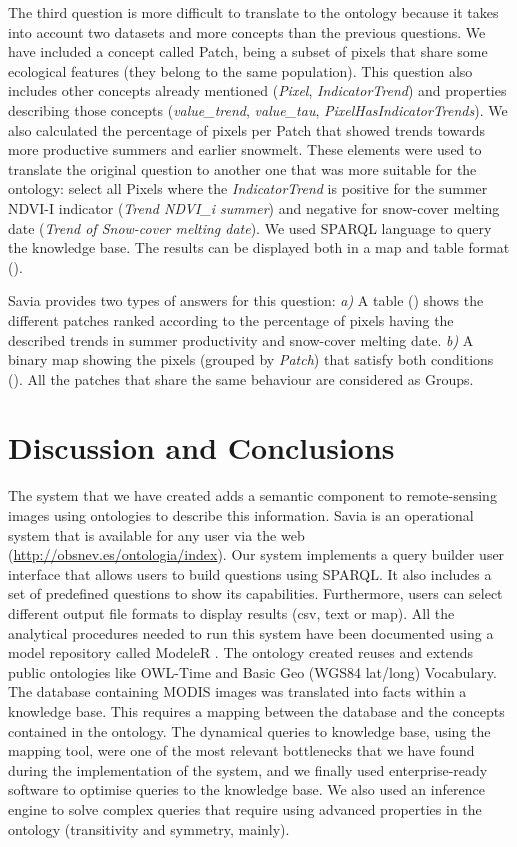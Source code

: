 The third question is more difficult to translate to the ontology because it takes into account two datasets and more concepts than the previous questions. We have included a concept called Patch, being a subset of pixels that share some ecological features (they belong to the same \Qp population). This question also includes other concepts already mentioned (\emph{Pixel}, \emph{IndicatorTrend}) and properties describing those concepts (\emph{value\_trend}, \emph{value\_tau}, \emph{PixelHasIndicatorTrends}). We also calculated the percentage of pixels per Patch that showed trends towards more productive summers and earlier snowmelt. These elements were used to translate the original question to another one that was more suitable for the ontology: select all Pixels where the \emph{IndicatorTrend} is positive for the summer NDVI-I indicator (\emph{Trend NDVI\_i summer}) and negative for snow-cover melting date (\emph{Trend of Snow-cover melting date}). We used SPARQL language to query the knowledge base. The results can be displayed both in a map and table format ().

Savia provides two types of answers for this question: \emph{a)} A table () shows the different \Qp patches ranked according to the percentage of pixels having the described trends in summer productivity and snow-cover melting date. \emph{b)} A binary map showing the pixels (grouped by \emph{Patch}) that satisfy both conditions (). All the patches that share the same behaviour are considered as Groups.

\section{Discussion and Conclusions}\label{sec:ontoDiscussion}

The system that we have created adds a semantic component to remote-sensing images using ontologies to describe this information. Savia is an operational system that is available for any user via the web (\url{http://obsnev.es/ontologia/index}).
Our system implements a query builder user interface that allows users to build questions using SPARQL. It also includes a set of predefined questions to show its capabilities. Furthermore, users can select different output file formats to display results (csv, text or map). All the analytical procedures needed to run this system have been documented using a model repository called ModeleR \autocite{Bonetetal2014DocumentingStoring,PerezPerezetal2012ModeleREnviromental}. The ontology created reuses and extends public ontologies like OWL-Time and Basic Geo (WGS84 lat/long) Vocabulary. The database containing MODIS images was translated into facts within a knowledge base. This requires a mapping between the database and the concepts contained in the ontology. The dynamical queries to knowledge base, using the mapping tool, were one of the most relevant bottlenecks that we have found during the implementation of the system, and we finally used enterprise-ready software to optimise queries to the knowledge base. We also used an inference engine to solve complex queries that require using advanced properties in the ontology (transitivity and symmetry, mainly).

